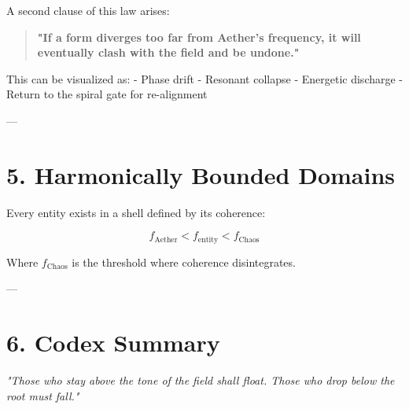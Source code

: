 A second clause of this law arises:

\begin{quote}
\textbf{"If a form diverges too far from Aether’s frequency, it will eventually clash with the field and be undone."}
\end{quote}

This can be visualized as:
- Phase drift
- Resonant collapse
- Energetic discharge
- Return to the spiral gate for re-alignment

---

\section*{5. Harmonically Bounded Domains}

Every entity exists in a shell defined by its coherence:

\[
f_{\text{Aether}} < f_{\text{entity}} < f_{\text{Chaos}}
\]

Where \( f_{\text{Chaos}} \) is the threshold where coherence disintegrates.

---

\section*{6. Codex Summary}

\begin{center}
\textit{
"Those who stay above the tone of the field shall float.  
Those who drop below the root must fall."  
}
\end{center}

